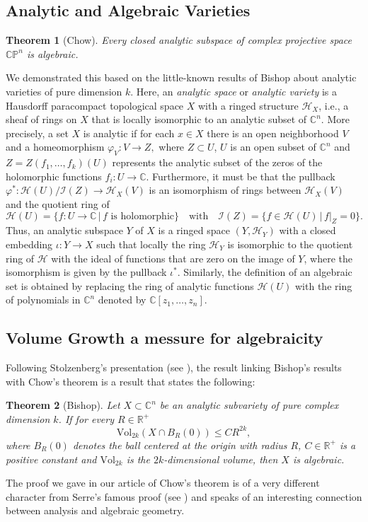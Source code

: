 \documentclass[12pt,twoside,a4paper]{report}
\newtheorem{theorem}{Theorem}[section]
\newcommand{\co}{\ensuremath{\mathbb C }}
\newcommand{\con}{\ensuremath{\mathbb{C}^n}}
\newcommand{\cp}{\ensuremath{\mathbb{CP}}}
\newcommand{\re}{\ensuremath{\mathbb R }}
\begin{document}
\subsection{Analytic and Algebraic Varieties}
\begin{theorem}[Chow]\label{Chow}
        Every closed analytic subspace of complex projective space $\cp^{n}$ is algebraic.
\end{theorem}
\noindent We demonstrated this based on the little-known results of Bishop about analytic varieties of pure dimension $k$. Here, an \emph{analytic space} or \emph{analytic variety} is a Hausdorff paracompact topological space $X$ with a ringed structure $\mathcal{H}_X$, i.e., a sheaf of rings on $X$ that is locally isomorphic to an analytic subset of $\con$. More precisely, a set $X$ is analytic if for each $x\in X$ there is an open neighborhood $V$ and a homeomorphism $\varphi_V:V\rightarrow Z,$ where $Z\subset U$, $U$ is an open subset of $\con$ and $Z=Z(f_1,\dots,f_k)(U)$ represents the analytic subset of the zeros of the holomorphic functions $f_i:U\rightarrow\co$. Furthermore, it must be that the pullback $\varphi^{*}:\mathcal{H}(U)/\mathcal{I}(Z)\rightarrow \mathcal{H}_X(V)$
is an isomorphism of rings between $\mathcal{H}_X(V)$ and the quotient ring of
\[
        \mathcal{H}(U)=\{f:U\rightarrow\co\,|\,f \text{ is holomorphic}\}\quad\text{with}\quad\mathcal{I}(Z)=\{f\in\mathcal{H}(U)\,|\,f|_{Z}=0\}.
\]
Thus, an analytic subspace $Y$ of $X$ is a ringed space $(Y,\mathcal{H}_Y)$ with a closed embedding $\iota:Y\rightarrow X$ such that locally the ring
$\mathcal{H}_Y$ is isomorphic to the quotient ring of $\mathcal{H}$ with the ideal of functions that are zero on the image of $Y$, where the isomorphism is given by the
pullback $\iota^{*}$. Similarly, the definition of an algebraic set is obtained by replacing the ring of analytic functions $\mathcal{H}(U)$ with the ring of
polynomials in $\con$ denoted by $\co[z_1,\dots,z_n]$.
\subsection{Volume Growth a messure for algebraicity}
\noindent Following Stolzenberg's presentation (see \cite{Stolzenberg}), the result linking
Bishop's results with Chow's theorem is a result that states the following:
\begin{theorem}[Bishop]\label{Bishop1}
        Let $X\subset\con$ be an analytic subvariety of pure complex dimension $k$. If for every $R\in\re^+$
        $$\textrm{Vol}_{2k}(X\cap B_R(0))\leq CR^{2k},$$
        where $B_R(0)$ denotes the ball centered at the origin with radius $R$, $C\in\re^{+}$ is a positive constant
        and $\textrm{Vol}_{2k}$ is the $2k$-dimensional volume, then $X$ is algebraic.
\end{theorem}
\noindent The proof we gave in our article of Chow's theorem is of a very different character from Serre's famous proof (see \cite{GAGA}) and speaks of an interesting connection between analysis and algebraic geometry.
\end{document}

